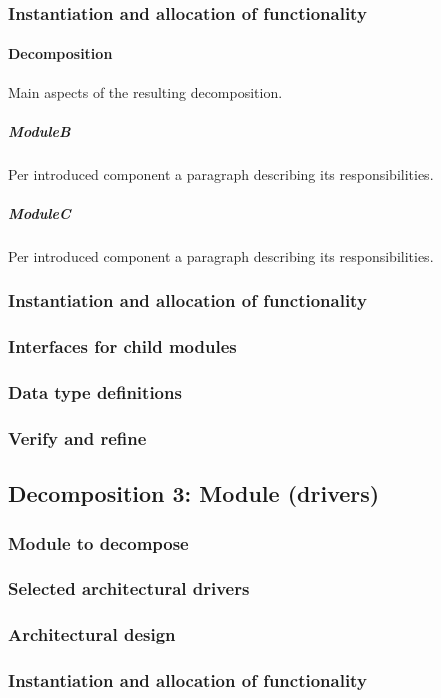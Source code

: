 \documentclass[a4paper,10pt]{article}
\begin{document}
\subsubsection{Instantiation and allocation of functionality}
\paragraph{Decomposition}
Main aspects of the resulting decomposition.

\subparagraph{ModuleB}
Per introduced component a paragraph describing its responsibilities.

\subparagraph{ModuleC}
Per introduced component a paragraph describing its responsibilities.


\subsubsection{Instantiation and allocation of functionality}
\subsubsection{Interfaces for child modules}
\subsubsection{Data type definitions}
\subsubsection{Verify and refine}

\subsection{Decomposition 3: Module (drivers)}
\subsubsection{Module to decompose}
\subsubsection{Selected architectural drivers}
\subsubsection{Architectural design}
\subsubsection{Instantiation and allocation of functionality}
\end{document}
